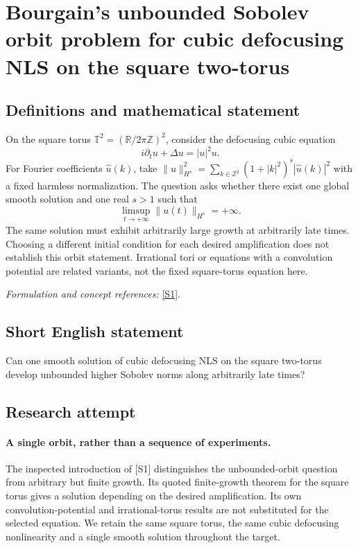 \documentclass[11pt]{article}
\begin{document}
\section*{\texorpdfstring{Bourgain's unbounded Sobolev orbit problem for cubic defocusing NLS on the square two-torus}{Bourgain's unbounded Sobolev orbit problem for cubic defocusing NLS on the square two-torus}}\label{statement}
\subsection{Definitions and mathematical statement}
On the square torus $\mathbb T^2=({\mathbb{R}}/2\pi{\mathbb{Z}})^2$, consider the defocusing cubic equation
\[
 i\partial_tu+\Delta u=|u|^2u.
\]
For Fourier coefficients $\widehat u(k)$, take $\|u\|_{H^s}^2=\sum_{k\in{\mathbb{Z}}^2}(1+|k|^2)^s|\widehat u(k)|^2$ with a fixed harmless normalization. The question asks whether there exist one global smooth solution and one real $s>1$ such that
\[
 \limsup_{t\to+\infty}\|u(t)\|_{H^s}=+\infty.
\]
The same solution must exhibit arbitrarily large growth at arbitrarily late times. Choosing a different initial condition for each desired amplification does not establish this orbit statement. Irrational tori or equations with a convolution potential are related variants, not the fixed square-torus equation here.
\par\smallskip\textit{Formulation and concept references:} \href{https://arxiv.org/html/2308.13468}{[S1]}.

\subsection{Short English statement}
Can one smooth solution of cubic defocusing NLS on the square two-torus develop unbounded higher Sobolev norms along arbitrarily late times?
\subsection{Research attempt}
\paragraph{A single orbit, rather than a sequence of experiments.}
The inspected introduction of [S1] distinguishes the unbounded-orbit
question from arbitrary but finite growth. Its quoted finite-growth
theorem for the square torus gives a solution depending on the desired
amplification. Its own convolution-potential and irrational-torus
results are not substituted for the selected equation. We retain the
same square torus, the same cubic defocusing nonlinearity and a single
smooth solution throughout the target.
\end{document}

